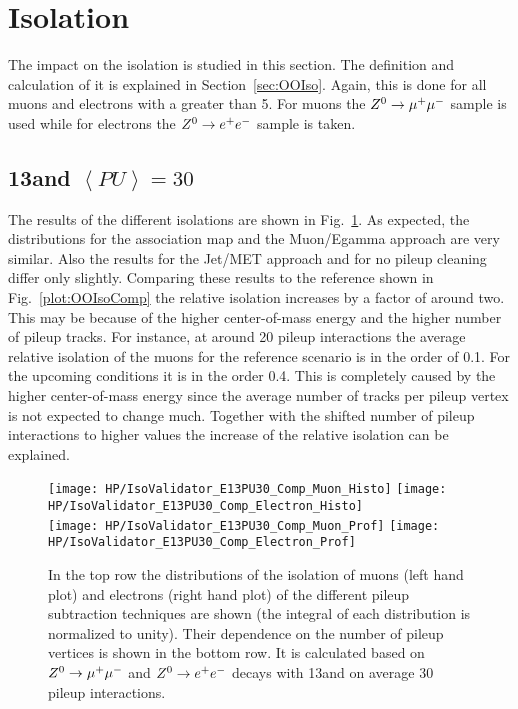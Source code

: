 \section{Isolation \label{sec:HPUIso}}

The impact on the isolation is studied in this section. The definition and calculation of it is explained in Section~\ref{sec:OOIso}. Again, this is done for all muons and electrons with a \pt greater than 5\GeV. For muons the ${Z^{0}}\rightarrow\mu^+\mu^-$ sample is used while for electrons the ${Z^{0}}\rightarrow e^+e^-$ sample is taken. 

\subsection{13\TeV and $\left<PU\right>=30$ \label{sec:HPUIsoE13PU30}}

The results of the different isolations are shown in Fig.~\ref{plot:HPUIsoE13PU30}. As expected, the distributions for the association map and the Muon/Egamma approach are very similar. Also the results for the Jet/MET approach and for no pileup cleaning differ only slightly. Comparing these results to the reference shown in Fig.~\ref{plot:OOIsoComp}  the relative isolation increases by a factor of around two. This may be because of the higher center-of-mass energy and the higher number of pileup tracks. For instance, at around 20 pileup interactions the average relative isolation of the muons for the reference scenario is in the order of 0.1. For the upcoming conditions it is in the order 0.4. This is completely caused by the higher center-of-mass energy since the average number of tracks per pileup vertex is not expected to change much. Together with the shifted number of pileup interactions to higher values the increase of the relative isolation can be explained.

\begin{figure}[h!t]
  \centering
  \texttt{[image: HP/IsoValidator\_E13PU30\_Comp\_Muon\_Histo]}
  \texttt{[image: HP/IsoValidator\_E13PU30\_Comp\_Electron\_Histo]}
  \\
  \texttt{[image: HP/IsoValidator\_E13PU30\_Comp\_Muon\_Prof]}
  \texttt{[image: HP/IsoValidator\_E13PU30\_Comp\_Electron\_Prof]}
  \caption[Distribution of the isolation of muons and electrons and their dependence on the number of pileup vertices for events with 13\TeV and PU=30]{In the top row the distributions of the isolation of muons (left hand plot) and electrons (right hand plot) of the different pileup subtraction techniques are shown (the integral of each distribution is normalized to unity). Their dependence on the number of pileup vertices is shown in the bottom row. It is calculated based on ${Z^{0}}\rightarrow\mu^+\mu^-$ and ${Z^{0}}\rightarrow e^+e^-$ decays with 13\TeV and on average 30 pileup interactions.\label{plot:HPUIsoE13PU30}}
\end{figure}

